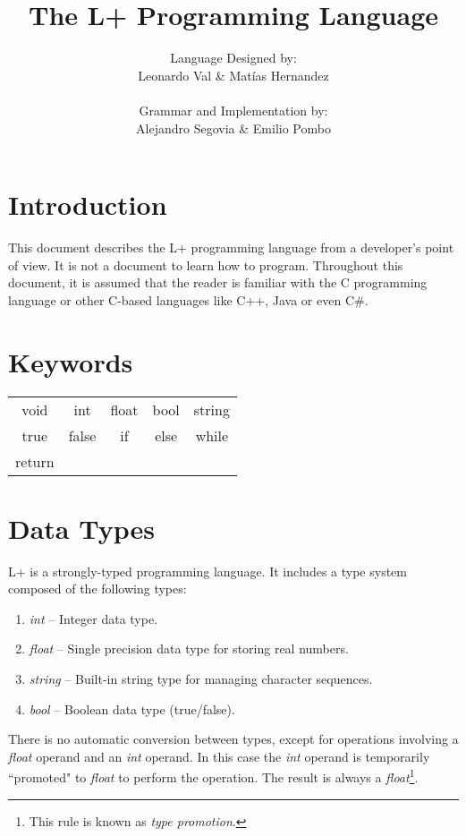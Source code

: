 \documentclass[11pt, a4paper]{article}
\title{The L+ Programming Language}
\author{Language Designed by: \\ Leonardo Val \& Mat\'ias Hernandez \\ \\ Grammar and Implementation by: \\ Alejandro Segovia \& Emilio Pombo}
\begin{document}
\maketitle
\section{Introduction}

This document describes the L+ programming language from a developer's point of view. It is not a document to learn how to program. Throughout this document, it is assumed that the reader is familiar with the C programming language or other C-based languages like C++, Java or even C\#.

\section{Keywords}
\begin{center}
\begin{tabular}{c c c c c}
void & int & float & bool & string \\
true & false & if & else & while \\
return
\end{tabular}
\end{center}

\section{Data Types}

L+ is a strongly-typed programming language. It includes a type system composed of the following types:

\begin{enumerate}
\item \emph{int} -- Integer data type.
\item \emph{float} -- Single precision data type for storing real numbers.
\item \emph{string} -- Built-in string type for managing character sequences.
\item \emph{bool} -- Boolean data type (true/false).
\end{enumerate}

There is no automatic conversion between types, except for operations involving a \emph{float} operand and an \emph{int} operand. In this case the \emph{int} operand is temporarily ``promoted" to \emph{float} to perform the operation. The result is always a \emph{float}\footnote{This rule is known as \emph{type promotion}.}.
\end{document}
